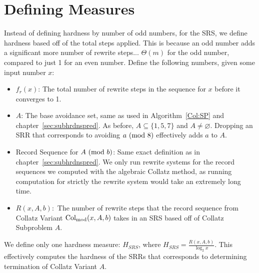 \section{Defining Measures} \label{subsec:rewritemeasuredefs}
Instead of defining hardness by number of odd numbers, for the SRS, we define hardness based off of the total steps applied. This is because an odd number adds a significant more number of rewrite steps... $\Theta(m)$ for the odd number, compared to just 1 for an even number. Define the following numbers, given some input number $x$:
\begin{itemize}
    \item $f_r(x)$: The total number of rewrite steps in the sequence for $x$ before it converges to 1.
    \item $A$: The base avoidance set, same as used in Algorithm~\ref{Col:SP} and chapter~\ref{sec:subhrdnspred}. As before, $A \subseteq \{1, 5, 7\}$ and $A \ne \varnothing$. Dropping an SRR that corresponds to avoiding $a \ (\mathrm{mod}\ 8)$  effectively adds $a$ to $A$.
    \item Record Sequence for $A \ (\mathrm{mod}\ b)$: Same exact definition as in chapter~\ref{sec:subhrdnspred}. We only run rewrite systems for the record sequences we computed with the algebraic Collatz method, as running computation for strictly the rewrite system would take an extremely long time.
    \item $R(x, A, b):$ The number of rewrite steps that the record sequence from Collatz Variant $\mathrm{Col}_{\text{mod}}(x,A,b)$ takes in an SRS based off of Collatz Subproblem $A$. 
\end{itemize}
We define only one hardness measure: $H_{SRS}$, where $H_{SRS} = \frac{R(x, A, b)}{\log_2{x}}$. This effectively computes the hardness of the SRRs that corresponds to determining termination of Collatz Variant $A$.

